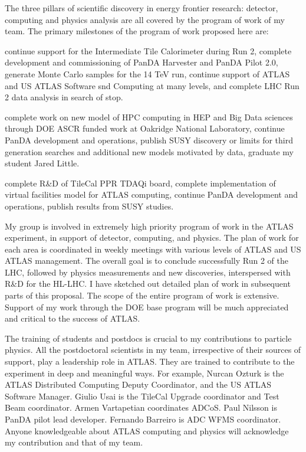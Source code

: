 The three pillars of scientific discovery in energy frontier research: detector, computing and physics analysis are all covered by the program of work of my team. The primary milestones of the program of work proposed here are:
\begin{description}
\item[2017] continue support for the Intermediate Tile Calorimeter during Run 2, complete development and commissioning of PanDA Harvester and PanDA Pilot 2.0, generate Monte Carlo samples for the 14 TeV run, continue support of ATLAS and US ATLAS Software snd Computing at many levels, and complete LHC Run 2 data analysis in search of stop.
\item[2018] complete work on new model of HPC computing in HEP and Big Data sciences through DOE ASCR funded work at Oakridge National Laboratory, continue PanDA development and operations, publish SUSY discovery or limits for third generation searches and additional new models motivated by data, graduate my student Jared Little.
\item[2019] complete R\&D of TileCal PPR TDAQi board, complete implementation of virtual facilities model for ATLAS computing, continue PanDA development and operations, publish results from SUSY studies.
\end{description}

My group is involved in extremely high priority program of work in the ATLAS experiment, in support of detector, computing, and physics. The plan of work for each area is coordinated in weekly meetings with various levels of ATLAS and US ATLAS management. The overall goal is to conclude successfully Run 2 of the LHC, followed by physics measurements and new discoveries, interspersed with R\&D for the HL-LHC. I have sketched out detailed plan of work in subsequent parts of this proposal. The scope of the entire program of work is extensive. Support of my work through the DOE base program will be much appreciated and critical to the success of ATLAS.

The training of students and postdocs is crucial to my contributions to particle physics. All the postdoctoral scientists in my team, irrespective of their sources of support, play a leadership role in ATLAS. They are trained to contribute to the experiment in deep and meaningful ways. For example, Nurcan Ozturk is the ATLAS Distributed Computing Deputy Coordinator, and the US ATLAS Software Manager. Giulio Usai is the TileCal Upgrade coordinator and Test Beam coordinator. Armen Vartapetian coordinates ADCoS. Paul Nilsson is PanDA pilot lead developer. Fernando Barreiro is ADC WFMS coordinator. Anyone knowledgeable about ATLAS computing and physics will acknowledge my contribution and that of my team.

